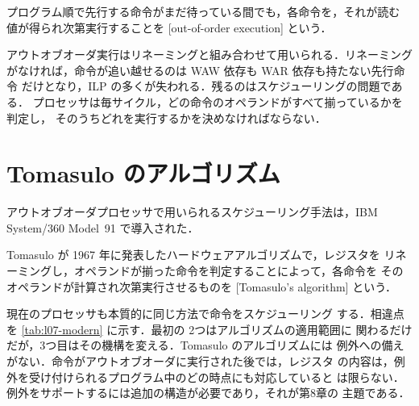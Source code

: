 \documentclass[../main.tex]{subfiles}
\begin{document}
\begin{definition}[アウトオブオーダ実行]
  \label{def:l07-ooo}
  プログラム順で先行する命令がまだ待っている間でも，各命令を，それが読む
  値が得られ次第実行することを
  [out-of-order execution]%
  という．
\end{definition}

アウトオブオーダ実行はリネーミングと組み合わせて用いられる．リネーミング
がなければ，命令が追い越せるのは WAW 依存も WAR 依存も持たない先行命令
だけとなり，ILP の多くが失われる．残るのはスケジューリングの問題である．
プロセッサは毎サイクル，どの命令のオペランドがすべて揃っているかを判定し，
そのうちどれを実行するかを決めなければならない．

\section{Tomasulo のアルゴリズム}
\label{sec:l07-tomasulo}

アウトオブオーダプロセッサで用いられるスケジューリング手法は，IBM
System/360 Model~91 で導入された．

\begin{definition}
  \label{def:l07-tomasulo}
  Tomasulo が 1967 年に発表したハードウェアアルゴリズムで，レジスタを
  リネーミングし，オペランドが揃った命令を判定することによって，各命令を
  そのオペランドが計算され次第実行させるものを
  [Tomasulo's algorithm]%
  という．
\end{definition}

現在のプロセッサも本質的に同じ方法で命令をスケジューリング
する．相違点を
\cref{tab:l07-modern} に示す．最初の 2つはアルゴリズムの適用範囲に
関わるだけだが，3つ目はその機構を変える．Tomasulo のアルゴリズムには
例外への備えがない．命令がアウトオブオーダに実行された後では，レジスタ
の内容は，例外を受け付けられるプログラム中のどの時点にも対応していると
は限らない．例外をサポートするには追加の構造が必要であり，それが第8章の
主題である．
\end{document}
